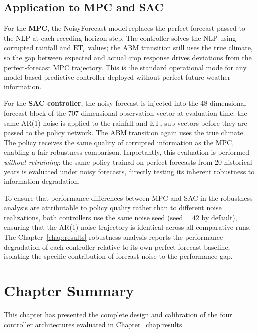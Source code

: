 \subsection{Application to MPC and SAC}
\label{ssec:ctrl-noise-application}

For the \textbf{MPC}, the NoisyForecast model replaces the perfect forecast
passed to the NLP at each receding-horizon step. The controller solves the
NLP using corrupted rainfall and $\mathrm{ET}_c$ values; the ABM transition
still uses the true climate, so the gap between expected and actual crop
response drives deviations from the perfect-forecast MPC trajectory. This is
the standard operational mode for any model-based predictive controller
deployed without perfect future weather information.

For the \textbf{SAC controller}, the noisy forecast is injected into the
48-dimensional forecast block of the 707-dimensional observation vector at
evaluation time: the same AR(1) noise is applied to the rainfall and
$\mathrm{ET}_c$ sub-vectors before they are passed to the policy network.
The ABM transition again uses the true climate. The policy receives the same
quality of corrupted information as the MPC, enabling a fair robustness
comparison. Importantly, this evaluation is performed \emph{without
retraining}: the same policy trained on perfect forecasts from 20 historical
years is evaluated under noisy forecasts, directly testing its inherent
robustness to information degradation.

To ensure that performance differences between MPC and SAC in the
robustness analysis are attributable to policy quality rather than to
different noise realizations, both controllers use the same noise seed
($\mathrm{seed} = 42$ by default), ensuring that the AR(1) noise trajectory
is identical across all comparative runs. The Chapter~\ref{chap:results}
robustness analysis reports the performance degradation of each controller
relative to its own perfect-forecast baseline, isolating the specific
contribution of forecast noise to the performance gap.

\section{Chapter Summary}
\label{sec:ctrl-summary}

This chapter has presented the complete design and calibration of the four
controller architectures evaluated in Chapter~\ref{chap:results}.

